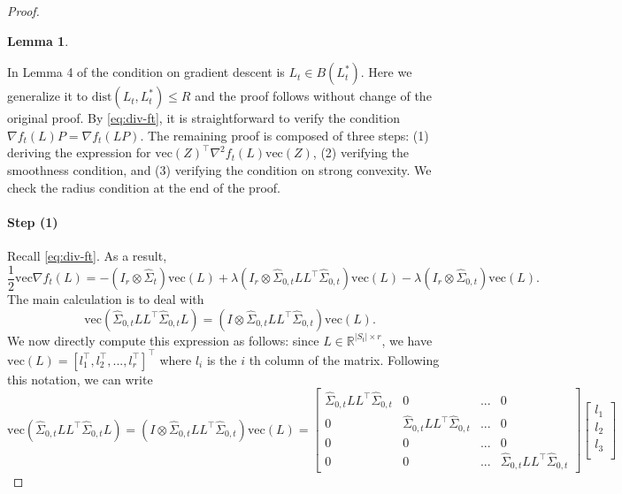 \documentclass[11pt]{article}
\newcommand{\nb}[1]{\textcolor{orange}{\texttt{[#1]}}}
\newcommand{\gsc}[1]{\textcolor{blue}{\texttt{[#1]}}}
\newcommand{\dist}{\mathrm{dist}}
\newcommand{\sot}{\widehat{\Sigma}_{0,t}}
\newcommand{\0}{{\mathbf{0}}}
\newcommand{\ve}{{\mathrm{vec}}}
\newtheorem{lemma}[theorem]{Lemma}
\begin{document}
\begin{proof}
\begin{lemma}
\end{lemma}
In Lemma 4 of \cite{chi2019nonconvex} the condition on gradient descent is $L_t\in B(L^*_t)$. Here we generalize it to $\dist(L_t,L^*_t)\leq R$ and the proof follows without change of the original proof.
By \eqref{eq:div-ft}, it is straightforward to verify the condition $\nabla f_t(L) P=\nabla f_t(LP)$.
The remaining proof is composed of three steps: (1) deriving the expression for $\ve(Z)^\top  \nabla^2f_t(L)\ve(Z)$, (2) verifying the smoothness condition, and (3) verifying the condition on strong convexity. 
We check the radius condition at the end of the proof.  

\paragraph{Step (1)} 
Recall \eqref{eq:div-ft}.
As a result, 
\begin{equation*}
\frac{1}{2}\ve \nabla f_t(L)=-(I_{r}\otimes \widehat{\Sigma}_t)\ve (L)+\lambda(I_{r}\otimes\sot LL^\top  \sot)\ve (L)-\lambda (I_{r}\otimes \sot)\ve(L).
\end{equation*} The main calculation is to deal with\begin{equation*}
\ve(\sot LL^\top  \sot L)=(I\otimes\sot LL^\top  \sot)\ve (L).
\end{equation*}
We now directly compute this expression as follows: since $L\in\mathbb{R}^{|S_t|\times r}$, we have $\ve(L)=[l_1^\top  , l_2^\top,...,l_r^\top  ] ^\top $ where $l_i$ is the $i$ th column of the matrix. Following this notation, we can write\begin{equation*}
\ve(\sot LL^\top  \sot L)=(I\otimes\sot LL^\top  \sot)\ve (L)=\begin{bmatrix}
\sot LL^\top  \sot & 0 &...&0\\
0 & \sot LL^\top  \sot &...&0\\
0&0& ...&0\\
0 & 0 &...&\sot LL^\top  \sot
\end{bmatrix}\begin{bmatrix}
l_1 \\
l_2\\
l_3\\

\end{bmatrix}
\end{equation*}
\end{proof}
\end{document}
